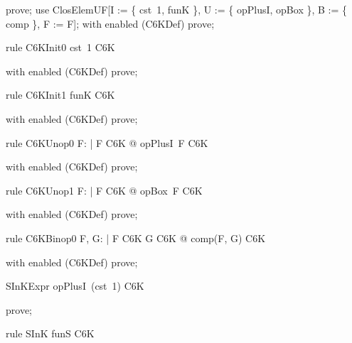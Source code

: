 \documentclass{article}
\begin{document}
\begin{zproof}
prove;
use ClosElemUF[I := \{ cst~1, funK \}, U := \{ opPlusI, opBox \}, B := \{ comp \}, F := F];
with enabled (C6KDef) prove;
\end{zproof}

\begin{theorem}{rule C6KInit0}
  cst~1 \in C6K
\end{theorem}

\begin{zproof}
with enabled (C6KDef) prove;
\end{zproof}

\begin{theorem}{rule C6KInit1}
  funK \in C6K
\end{theorem}

\begin{zproof}
with enabled (C6KDef) prove;
\end{zproof}

\begin{theorem}{rule C6KUnop0}
  \forall F: \nat \fun \nat | F \in C6K @ opPlusI~F \in C6K
\end{theorem}

\begin{zproof}
with enabled (C6KDef) prove;
\end{zproof}

\begin{theorem}{rule C6KUnop1}
  \forall F: \nat \fun \nat | F \in C6K @ opBox~F \in C6K
\end{theorem}

\begin{zproof}
with enabled (C6KDef) prove;
\end{zproof}

\begin{theorem}{rule C6KBinop0}
  \forall F, G: \nat \fun \nat | F \in C6K \land G \in C6K @ comp(F, G) \in C6K
\end{theorem}

\begin{zproof}
with enabled (C6KDef) prove;
\end{zproof}

\begin{theorem}{SInKExpr}
  opPlusI~(cst~1) \in C6K
\end{theorem}

\begin{zproof}
prove;
\end{zproof}

\begin{theorem}{rule SInK}
  funS \in C6K
\end{theorem}
\end{document}
